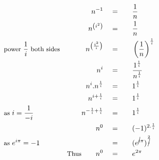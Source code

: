 \begin{alignat*}{5}
&\,&n^{-1}\quad&=\quad&&\frac{1}{n}\\
&\,&n^{\left(i^2\right)}\quad&=&&\frac{1}{n}\\
&\small\text{power }\frac{1}{i}\text{ both sides}&n^{\left(\frac{i^2}{i}\right)}\quad&=&&\left(\frac{1}{n}\right)^\frac{1}{i}\\
&\,&n^i\quad&=&&\frac{1^\frac{1}{i}}{n^\frac{1}{i}}\\
&\,&n^i.n^\frac{1}{i}\quad&=&&1^\frac{1}{i}\\
&\,&n^{i+\frac{1}{i}}\quad&=&&1^\frac{1}{i}\\
&\small\text{as }i=\frac{1}{-i}&n^{-\frac{1}{i}+\frac{1}{i}}\quad&=&&1^\frac{1}{i}\\
&\,&n^0\quad&=&&(-1)^{2.\frac{1}{i}}\\
&\small\text{as }e^{i\pi}=-1&\,&=&&(e^{\cancel{i}\pi})^\frac{2}{\cancel{i}}\\
&\,&\small\text{Thus}\normalsize\qquad n^0\quad&=&&e^{2\pi}\\
\end{alignat*}
